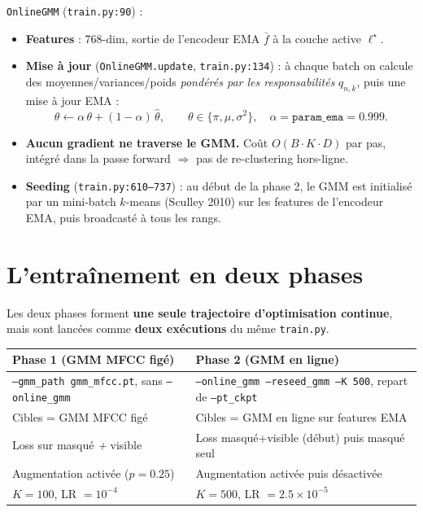 \documentclass[11pt,a4paper]{article}
\newcommand{\code}[1]{\texttt{#1}}
\newcommand{\file}[1]{\texttt{#1}}
\begin{document}
\code{OnlineGMM} (\file{train.py:90}) :
\begin{itemize}[leftmargin=*]
  \item \textbf{Features} : 768-dim, sortie de l'encodeur EMA $\bar f$ à la
  couche active $\ell^\star$.
  \item \textbf{Mise à jour} (\code{OnlineGMM.update}, \file{train.py:134}) :
  à chaque batch on calcule des moyennes/variances/poids \emph{pondérés par
  les responsabilités} $q_{n,k}$, puis une mise à jour EMA :
  \begin{equation}
  \theta \leftarrow \alpha\,\theta + (1-\alpha)\,\hat\theta,
  \qquad \theta \in \{\pi,\mu,\sigma^2\},\quad \alpha = \texttt{param\_ema} = 0.999.
  \end{equation}
  \item \textbf{Aucun gradient ne traverse le GMM.} Coût $O(B\cdot K\cdot D)$
  par pas, intégré dans la passe forward $\Rightarrow$ pas de re-clustering
  hors-ligne.
  \item \textbf{Seeding} (\file{train.py:610--737}) : au début de la phase 2,
  le GMM est initialisé par un mini-batch $k$-means (Sculley 2010) sur les
  features de l'encodeur EMA, puis broadcasté à tous les rangs.
\end{itemize}

\section{L'entraînement en deux phases}

Les deux phases forment \textbf{une seule trajectoire d'optimisation
continue}, mais sont lancées comme \textbf{deux exécutions} du même
\file{train.py}.

\begin{center}
\begin{tabular}{@{}p{}p{}@{}}
\toprule
\textbf{Phase 1 (GMM MFCC figé)} & \textbf{Phase 2 (GMM en ligne)} \\
\midrule
\code{--gmm\_path gmm\_mfcc.pt}, sans \code{--online\_gmm} &
\code{--online\_gmm --reseed\_gmm --K 500}, repart de \code{--pt\_ckpt} \\
Cibles = GMM MFCC figé &
Cibles = GMM en ligne sur features EMA \\
Loss sur masqué \emph{+} visible &
Loss masqué+visible (début) puis masqué seul \\
Augmentation activée ($p=0.25$) &
Augmentation activée puis désactivée \\
$K=100$, LR $=10^{-4}$ &
$K=500$, LR $=2.5\times10^{-5}$ \\
\bottomrule
\end{tabular}
\end{center}
\end{document}
